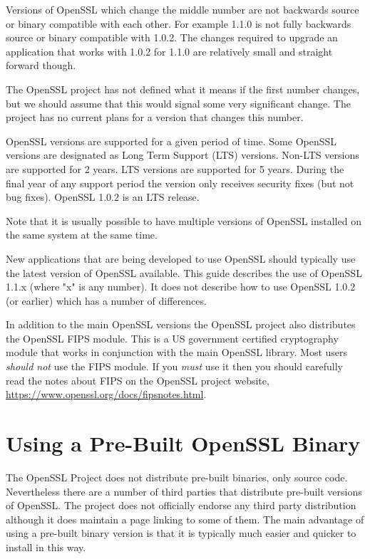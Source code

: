 Versions of OpenSSL which change the middle number are not backwards source or
binary compatible with each other. For example 1.1.0 is not fully backwards
source or binary compatible with 1.0.2. The changes required to upgrade an
application that works with 1.0.2 for 1.1.0 are relatively small and straight
forward though.

The OpenSSL project has not defined what it means if the first number changes,
but we should assume that this would signal some very significant change. The
project has no current plans for a version that changes this number.

OpenSSL versions are supported for a given period of time. Some OpenSSL versions
are designated as Long Term Support (LTS) versions. Non-LTS versions are supported
for 2 years. LTS versions are supported for 5 years. During the final year of
any support period the version only receives security fixes (but not bug fixes).
OpenSSL 1.0.2 is an LTS release.

Note that it is usually possible to have multiple versions of OpenSSL installed on
the same system at the same time.

New applications that are being developed to use OpenSSL should typically use the
latest version of OpenSSL available. This guide describes the use of OpenSSL 1.1.x
(where "x" is any number). It does not describe how to use OpenSSL 1.0.2 (or earlier)
which has a number of differences.

In addition to the main OpenSSL versions the OpenSSL project also distributes the
OpenSSL FIPS module. This is a US government certified cryptography module that
works in conjunction with the main OpenSSL library. Most users \emph{should not} use
the FIPS module. If you \emph{must} use it then you should carefully read the notes
about FIPS on the OpenSSL project website,
\url{https://www.openssl.org/docs/fipsnotes.html}.

\section{Using a Pre-Built OpenSSL Binary}

The OpenSSL Project does not distribute pre-built binaries, only source code.
Nevertheless there are a number of third parties that distribute pre-built
versions of OpenSSL. The project does not officially endorse any third party
distribution although it does maintain a page linking to some of them. The main
advantage of using a pre-built binary version is that it is typically much
easier and quicker to install in this way.

